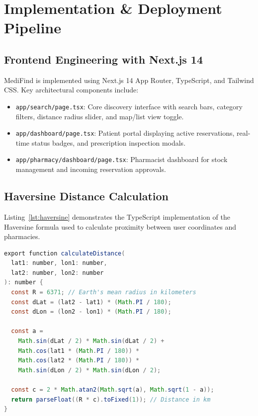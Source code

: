 \documentclass[12pt,a4paper]{report}
\begin{document}
\newpage
\chapter{Implementation \& Deployment Pipeline}

\section{Frontend Engineering with Next.js 14}
MediFind is implemented using Next.js 14 App Router, TypeScript, and Tailwind CSS. Key architectural components include:
\begin{itemize}
    \item \texttt{app/search/page.tsx}: Core discovery interface with search bars, category filters, distance radius slider, and map/list view toggle.
    \item \texttt{app/dashboard/page.tsx}: Patient portal displaying active reservations, real-time status badges, and prescription inspection modals.
    \item \texttt{app/pharmacy/dashboard/page.tsx}: Pharmacist dashboard for stock management and incoming reservation approvals.
\end{itemize}

\section{Haversine Distance Calculation}
Listing~\ref{lst:haversine} demonstrates the TypeScript implementation of the Haversine formula used to calculate proximity between user coordinates and pharmacies.

\begin{lstlisting}[language=Java, caption={Haversine Distance Calculation in TypeScript}, label={lst:haversine}]
export function calculateDistance(
  lat1: number, lon1: number, 
  lat2: number, lon2: number
): number {
  const R = 6371; // Earth's mean radius in kilometers
  const dLat = (lat2 - lat1) * (Math.PI / 180);
  const dLon = (lon2 - lon1) * (Math.PI / 180);
  
  const a = 
    Math.sin(dLat / 2) * Math.sin(dLat / 2) +
    Math.cos(lat1 * (Math.PI / 180)) * 
    Math.cos(lat2 * (Math.PI / 180)) * 
    Math.sin(dLon / 2) * Math.sin(dLon / 2);
    
  const c = 2 * Math.atan2(Math.sqrt(a), Math.sqrt(1 - a));
  return parseFloat((R * c).toFixed(1)); // Distance in km
}
\end{lstlisting}
\end{document}
